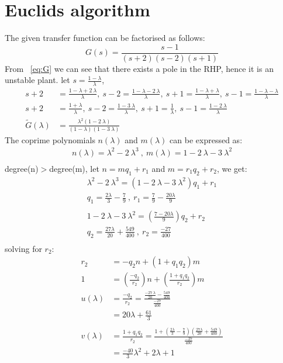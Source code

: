 \documentclass{scrreprt}
\begin{document}
\section{Euclids algorithm}
The given transfer function can be factorised as follows:
\begin{equation}
G(s) = \frac{s-1}{(s+2)(s-2)(s+1)}
 \label{eq:G}
\end{equation}
From ~\eqref{eq:G} we can see that there exists a pole in the RHP, hence it is an unstable plant.
let $s=\frac{1-\lambda}{\lambda}$,
\begin{align*}
s+2 &= \frac{1-\lambda+2\:\lambda}{\lambda}, \: s-2 = \frac{1-\lambda-2\:\lambda}{\lambda}, \: s+1 = \frac{1-\lambda+\lambda}{\lambda}, \: s-1 = \frac{1-\lambda-\lambda}{\lambda} \\
s+2 &= \frac{1+\lambda}{\lambda}, \: s-2 = \frac{1-3\:\lambda}{\lambda}, \: s+1 = \frac{1}{\lambda}, \: s-1 = \frac{1-2\:\lambda}{\lambda}\\
\tilde{G}(\lambda) &= \frac{\lambda^2(1-2\:\lambda)}{(1-\lambda)(1-3\:\lambda)}
\end{align*}
The coprime polynomials $n(\lambda)$ and $m(\lambda)$ can be expressed as:
\begin{align*}
n(\lambda) = \lambda^2 - 2\:\lambda^3 \:,\: m(\lambda) = 1-2\:\lambda-3\:\lambda^2\\
\end{align*}
degree(n)$>$degree(m), let $n=mq_1 + r_1$ and $m=r_1q_2 + r_2$, we get:
\begin{align*}
\lambda^2 - 2\:\lambda^3 = (1-2\:\lambda-3\:\lambda^2)q_1 + r_1\\
q_1 = \frac{2\lambda}{3} - \frac{7}{9}\: ,\: r_1 = \frac{7}{9} - \frac{20\lambda}{9}\\
\\
1-2\:\lambda-3\:\lambda^2 =  (\frac{7-20\lambda}{9})q_2 + r_2\\
q_2 = \frac{27\lambda}{20} + \frac{549}{400}\: ,\: r_2 = \frac{-27}{400}\\
\end{align*}
solving for $r_2$:
\begin{align*}
r_2 &= -q_2n + (1+q_1q_2)m \\
1 &= (\frac{-q_2}{r_2})n + (\frac{1+q_1q_2}{r_2})m\\
u(\lambda) &= \frac{-q_2}{r_2} = \frac{\frac{-27\:\lambda}{20} - \frac{549}{400}}{\frac{-27}{400}}\\
	&= 20\lambda + \frac{61}{3} \\
\\
v(\lambda) &= \frac{1+q_1q_2}{r_2} = \frac{1+ (\frac{2\lambda}{3} - \frac{7}{9})( \frac{27\lambda}{20} + \frac{549}{400})}{\frac{-27}{400}}\\
	&= \frac{-40}{3}\lambda^2+2\lambda+1\\
\end{align*}
\end{document}
